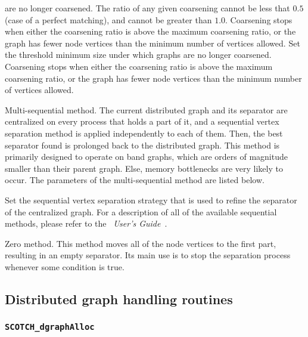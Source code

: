 \begin{itemize}
\begin{itemize}
\begin{itemize}
are no longer coarsened. The ratio of any given coarsening cannot be
less that $0.5$ (case of a perfect matching), and cannot be greater
than $1.0$. Coarsening stops when either the coarsening ratio is
above the maximum coarsening ratio, or the graph
has fewer node vertices than the minimum number of vertices allowed.
\iteme[{\tt vert=}{\it nbr}]
Set the threshold minimum size under which graphs
are no longer coarsened. Coarsening stops when either the coarsening
ratio is above the maximum coarsening ratio, or the graph
has fewer node vertices than the minimum number of vertices allowed.
\end{itemize}
\iteme[{\tt q}]
Multi-sequential method. The current distributed graph and its
separator are centralized on every process that holds a part of it, and
a sequential vertex separation method is applied independently to each
of them. Then, the best separator found is prolonged back to the
distributed graph. This method is primarily designed to operate on
band graphs, which are orders of magnitude smaller than their parent
graph. Else, memory bottlenecks are very likely to occur.
The parameters of the multi-sequential method are listed below.
\begin{itemize}
\iteme[{\tt strat=}{\it strat}]
Set the sequential vertex separation strategy that is used to refine
the separator of the centralized graph. For a description of all of
the available sequential methods, please refer to the
{\it\scotch\ User's Guide}~\scotchcitesuser.
\end{itemize}
\iteme[{\tt z}]
Zero method. This method moves all of the node vertices to the first
part, resulting in an empty separator. Its main use is to stop the
separation process whenever some condition is true.
\end{itemize}
\end{itemize}

\subsection{Distributed graph handling routines}
\label{sec-lib-dgraph}

\subsubsection{{\tt SCOTCH\_dgraphAlloc}}

